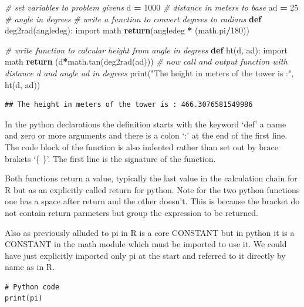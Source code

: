 \documentclass[]{book}
\newenvironment{Shaded}{\begin{snugshade}}{\end{snugshade}}
\newcommand{\KeywordTok}[1]{\textcolor[rgb]{0.13,0.29,0.53}{\textbf{#1}}}
\newcommand{\DecValTok}[1]{\textcolor[rgb]{0.00,0.00,0.81}{#1}}
\newcommand{\StringTok}[1]{\textcolor[rgb]{0.31,0.60,0.02}{#1}}
\newcommand{\ImportTok}[1]{#1}
\newcommand{\CommentTok}[1]{\textcolor[rgb]{0.56,0.35,0.01}{\textit{#1}}}
\newcommand{\ControlFlowTok}[1]{\textcolor[rgb]{0.13,0.29,0.53}{\textbf{#1}}}
\newcommand{\OperatorTok}[1]{\textcolor[rgb]{0.81,0.36,0.00}{\textbf{#1}}}
\newcommand{\BuiltInTok}[1]{#1}
\newcommand{\NormalTok}[1]{#1}
\theoremstyle{definition}
\theoremstyle{definition}
\theoremstyle{definition}
\theoremstyle{remark}
\begin{document}
\begin{Shaded}
\begin{Highlighting}[]
\CommentTok{# set variables to problem givens}
\NormalTok{d }\OperatorTok{=} \DecValTok{1000}    \CommentTok{# distance in meters to base}
\NormalTok{ad }\OperatorTok{=} \DecValTok{25}     \CommentTok{# angle in degrees}
\CommentTok{# write a function to convert degrees to radians}
\KeywordTok{def}\NormalTok{ deg2rad(angledeg):}
    \ImportTok{import}\NormalTok{ math}
    \ControlFlowTok{return}\NormalTok{(angledeg }\OperatorTok{*}\NormalTok{ (math.pi}\OperatorTok{/}\DecValTok{180}\NormalTok{))}
    
\CommentTok{# write function to calcular height from angle in degrees}
\KeywordTok{def}\NormalTok{ ht(d, ad):}
  \ImportTok{import}\NormalTok{ math}
  \ControlFlowTok{return}\NormalTok{ (d}\OperatorTok{*}\NormalTok{math.tan(deg2rad(ad)))}
\CommentTok{# now call and output function with distance d and angle ad in degrees}
\BuiltInTok{print}\NormalTok{(}\StringTok{"The height in meters of the tower is :"}\NormalTok{, ht(d, ad))}
\end{Highlighting}
\end{Shaded}

\begin{verbatim}
## The height in meters of the tower is : 466.3076581549986
\end{verbatim}

In the python declarations the definition starts with the keyword `def'
a name and zero or more arguments and there is a colon `:' at the end of
the first line. The code block of the function is also indented rather
than set out by brace brakets `\{ \}'. The first line is the signature
of the function.

Both functions return a value, typically the last value in the
calculation chain for R but as an explicitly called return for python.
Note for the two python functions one has a space after return and the
other doesn't. This is because the bracket do not contain return
parmeters but group the expression to be returned.

Also as previously alluded to pi in R is a core CONSTANT but in python
it is a CONSTANT in the math module which must be imported to use it. We
could have just explicitly imported only pi at the start and referred to
it directly by name as in R.

\begin{verbatim}
# Python code
print(pi)
\end{verbatim}
\end{document}
